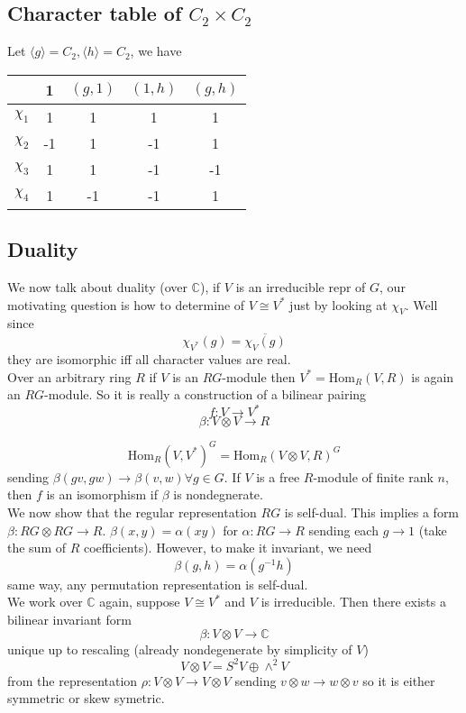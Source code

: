 \documentclass{article}
\theoremstyle{definition}
\theoremstyle{remark}
\theoremstyle{plain}
\newcommand{\C}{\mathbb{C}}
\begin{document}
\subsection{Character table of $C_2 \times C_2$}
Let $\langle g \rangle = C_2, \langle h \rangle = C_2$,
we have 
\begin{center}
\begin{tabular}{ c|c|c|c|c| } 
& 1 & $(g,1)$ & $(1,h)$ &  $(g,h)$ \\
 \hline
 $\chi_1$ & 1 & 1 & 1 &1\\
$\chi_2$ & -1 & 1 & -1 &1\\

$\chi_3$ & 1 & 1 & -1 &-1\\

$\chi_4$ & 1 & -1 & -1 &1\\

\end{tabular}
\end{center}

\subsection{Duality}
 We now talk about duality (over $\C$), if $V$ is an irreducible repr of $G$, our motivating question is how to determine of $V \cong V^*$ just by looking at $\chi_V$.
 Well since 
 \[\chi_{V^*}(g) = \overline{\chi_{V}(g) }\]
they are isomorphic iff all character values are real.\\

Over an arbitrary ring $R$ if $V$ is an $RG$-module then $V^* = \text{Hom}_R(V,R)$ is again an $RG$-module.
So it is really a construction of a bilinear pairing
\[f: V \to V^*\]
\[\beta: V \otimes V \to R\]

\[\text{Hom}_R(V, V^*)^G = \text{Hom}_R(V \otimes V, R)^G\]
sending $\beta(gv,gw) \to \beta(v,w) \forall g \in G$.
If $V$ is a free $R$-module of finite rank $n$, then $f$ is an isomorphism if $\beta$ is nondegnerate.\\

We now show that the regular representation $RG$ is self-dual.
This implies a form $\beta: RG \otimes RG \to R$.
$\beta(x,y) = \alpha(xy)$ for $\alpha: RG \to R$ sending each $g \to 1$ (take the sum of $R$ coefficients).
However, to make it invariant, we need 
\[\beta(g,h) = \alpha (g^{-1} h)\]
same way, any permutation representation is self-dual.\\

We work over $\C$ again, suppose $V \cong V^*$ and $V$ is irreducible.
Then there exists a bilinear invariant form
\[\beta: V \otimes V \to \C\]
unique up to rescaling (already nondegenerate by simplicity of $V$)
\[V \otimes V = S^2 V \oplus \wedge^2 V\]
from the representation $\rho: V \otimes V \to V \otimes V$ sending $v \otimes w \to w \otimes v$ so it is either symmetric or skew symetric.\\
\end{document}
